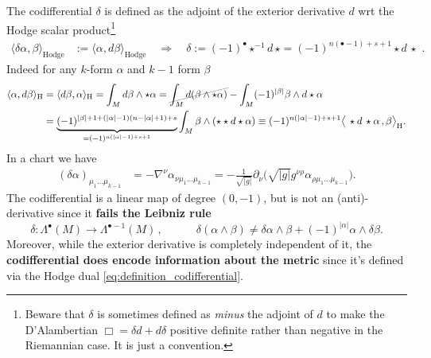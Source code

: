 \documentclass[../geometry_main.tex]{subfiles}
\begin{document}
\begin{mytheorem}
%
The codifferential \(\delta\) is defined as the adjoint of the exterior derivative \(d\) wrt the Hodge scalar product\footnote{Beware that $\delta$ is sometimes defined as \emph{minus} the adjoint of $d$ to make the D'Alambertian $\Box =\delta d+d\delta$ positive definite rather than negative in the Riemannian case. It is just a convention.}
\begin{align}\label{eq:definition_codifferential}
    \langle \delta \alpha, \beta \rangle_{\mathrm{Hodge}} &:= \langle \alpha, d \beta \rangle_{\mathrm{Hodge}} \quad \Rightarrow \quad \delta := (-1)^{\bullet} \star^{-1}d\,\star = (-1)^{n(\bullet-1)+s+1} \star d \,\star\,\,.
\end{align}
Indeed for any  $k$-form \(\alpha\) and $k\!-\!1$ form \(\beta\)
\begin{align}
    \langle \alpha, d\beta \rangle_{\mathrm{H}} 
    &= \langle d \beta, \alpha \rangle_{\mathrm{H}}
    = \int_M d \beta \wedge \star \alpha
    = \graycancel{\int_M d(\beta \wedge \star \alpha)} - \int_M (-1)^{|\beta|} \beta \wedge d\star \alpha
    \\
    &=
    \underbrace{(-1)^{|\beta|+1+(|\alpha|-1)(n-|\alpha|+1)+s}}_{=(-1)^{n(|\alpha|-1)+s+1}} \int_M  \beta \wedge (\star\star d\star \alpha)
    \equiv
    (-1)^{n(|\alpha|-1)+s+1} \big\langle\, \star d\,\star \alpha\,, \beta \big\rangle_{\mathrm{H}}.  
\end{align}
In a chart we have
\begin{align}
    (\delta \alpha)_{\mu_1 \dots \mu_{k-1}} 
    &= - \nabla^{\nu} \alpha_{\nu \mu_1 \dots \mu_{k-1}} 
    = - \frac{1}{\sqrt{|g|}} \partial_{\nu} \Big(\sqrt{|g|} g^{\nu \rho} \alpha_{\rho \mu_1 \dots \mu_{k-1}}\Big).
\end{align}
The codifferential is a linear map of degree \((0,-1)\), but is not an (anti)-derivative since it \textbf{fails the Leibniz rule} 
\begin{equation}
    \delta: \Lambda^\bullet (M) \to \Lambda^{\bullet-1} (M)\,, \quad \qquad \delta(\alpha \wedge \beta) \neq \delta \alpha \wedge \beta + (-1)^{|\alpha|} \alpha \wedge \delta \beta.
\end{equation}
Moreover, while the exterior derivative is completely independent of it, the \textbf{codifferential does encode information about the metric} since it's defined via the Hodge dual \eqref{eq:definition_codifferential}.
\smallskip


\end{mytheorem}
\end{document}
